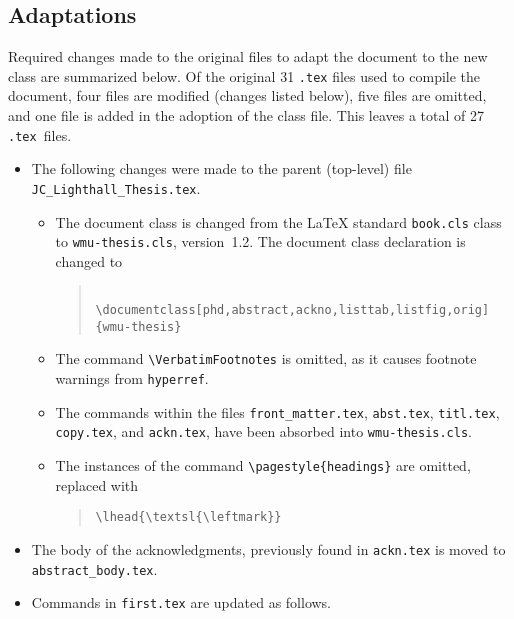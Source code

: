 \begin{spacing}{1.55}
\subsection{Adaptations}
\label{adapt}
Required changes made to the original files to adapt the document to the new class are summarized below.  Of the original 31 \texttt{.tex} files used to compile the document, four files are modified (changes listed below), five files are omitted, and one file is added in the adoption of the class file.  This leaves a total of 27 \texttt{.tex }files.
\begin{itemize}
	\setlength{\itemsep}{-4pt}
	\item The following changes were made to the parent (top-level) file \texttt{JC\_Lighthall\_Thesis.tex}.
		\vspace{-4pt}
		\begin{itemize}
			\setlength{\itemsep}{-2pt}
			\item The document class is changed from the \LaTeX{} standard \texttt{book.cls} class to \texttt{wmu-thesis.cls}, version~1.2.  The document class declaration is changed to
				\begin{quote}
					\begin{verbatim}
						\documentclass[phd,abstract,ackno,listtab,listfig,orig]{wmu-thesis}
					\end{verbatim}
				\end{quote}%
		 	\item The command \verb|\VerbatimFootnotes| is omitted, as it causes footnote warnings from \verb|hyperref|.
			\item The commands within the files \texttt{front\_matter.tex}, \texttt{abst.tex}, \texttt{titl.tex}, \texttt{copy.tex}, 
			and \texttt{ackn.tex}, have been absorbed into \texttt{wmu-thesis.cls}.
			\item The instances of the command \verb|\pagestyle{headings}| are omitted, replaced with
				\begin{quote}
					\verb|\lhead{\textsl{\leftmark}}|
				\end{quote}
		\end{itemize}
	\item The body of the acknowledgments, previously found in \texttt{ackn.tex} is moved to \verb|abstract_body.tex|.
	\item Commands in \texttt{first.tex} are updated as follows.
		\vspace{-4pt}	
		\begin{itemize}

\end{itemize}
\end{itemize}
\end{spacing}
